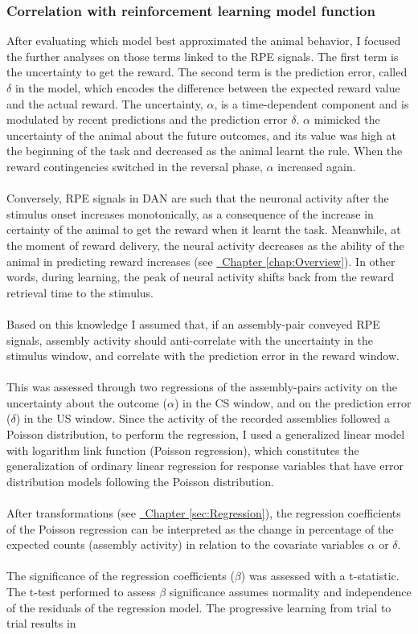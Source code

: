 \subsubsection{Correlation with reinforcement learning model function}
After evaluating which model best approximated the animal behavior, I focused the further analyses on those terms linked to the RPE signals. The first term is the uncertainty to get the reward. The second term is the prediction error, called $\delta$ in the model, which encodes the difference between the expected reward value and the actual reward. The uncertainty, $\alpha$, is a time-dependent component and is modulated by recent predictions and the prediction error $\delta$. $\alpha$ mimicked the uncertainty of the animal about the future outcomes, and its value was high at the beginning of the task and decreased as the animal learnt the rule. When the reward contingencies switched in the reversal phase, $\alpha$ increased again.\\\\Conversely, RPE signals in DAN are such that the neuronal activity after the stimulus onset increases monotonically, as a consequence of the increase in certainty of the animal to get the reward when it learnt the task. Meanwhile, at the moment of reward delivery, the neural activity decreases as the ability of the animal in predicting reward increases (see \hyperref[chap:Overview]{~Chapter \ref*{chap:Overview}}). In other words, during learning, the peak of neural activity shifts back from the reward retrieval time to the stimulus.\\\\Based on this knowledge I assumed that, if an assembly-pair conveyed RPE signals, assembly activity should anti-correlate with the uncertainty in the stimulus window, and correlate with the prediction error in the reward window.\\\\This was assessed through two regressions of the assembly-pairs activity on the uncertainty about the outcome ($\alpha$) in the CS window, and on the prediction error ($\delta$) in the US window. Since the activity of the recorded assemblies followed a Poisson distribution, to perform the regression, I used a generalized linear model with logarithm link function (Poisson regression), which constitutes the generalization of ordinary linear regression for response variables that have error distribution models following the Poisson distribution.\\\\After transformations (see \hyperref[sec:Regression]{~Chapter \ref*{sec:Regression}}), the regression coefficients of the Poisson regression can be interpreted as the change in percentage of the expected counts (assembly activity) in relation to the covariate variables $\alpha$ or $\delta$.\\\\The significance of the regression coefficients ($\beta$) was assessed with a t-statistic. The t-test performed to assess $\beta$ significance assumes normality and independence of the residuals of the regression model. The progressive learning from trial to trial results in 